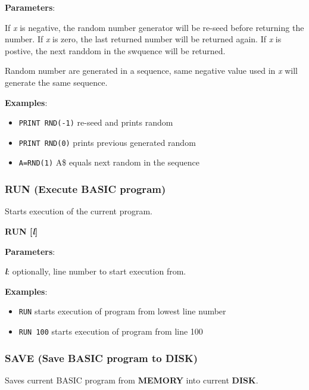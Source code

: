     \textbf{Parameters}:

    If \textit{x} is negative, the random number generator will be re-seed
    before returning the number. If \textit{x} is zero, the last returned number
    will be returned again. If \textit{x} is postive, the next randdom in the
    swquence will be returned.

    Random number are generated in a sequence, same negative value used in
    \textit{x} will generate the same sequence.

    \textbf{Examples}:
    \begin{itemize}
        \item \texttt{PRINT RND(-1)} re-seed and prints random
        \item \texttt{PRINT RND(0)} prints previous generated random
        \item \texttt{A=RND(1)} A\$ equals next random in the sequence
    \end{itemize}

    \subsubsection{{RUN (Execute BASIC program)}}
    \label{msbasic:lang:run}
    Starts execution of the current program.

    \hspace{1.9cm}\textbf{RUN [\textit{l}]}

    \textbf{Parameters}:

    \hspace{1cm}\textbf{\textit{l}}: optionally, line number to start execution
    from.

    \textbf{Examples}:
    \begin{itemize}
        \item \texttt{RUN} starts execution of program from lowest line number
        \item \texttt{RUN 100} starts execution of program from line 100
    \end{itemize}

    \subsubsection{{SAVE (Save BASIC program to DISK)}}
    \label{msbasic:lang:save}
    Saves current BASIC program from \textbf{MEMORY} into current
    \textbf{DISK}.

